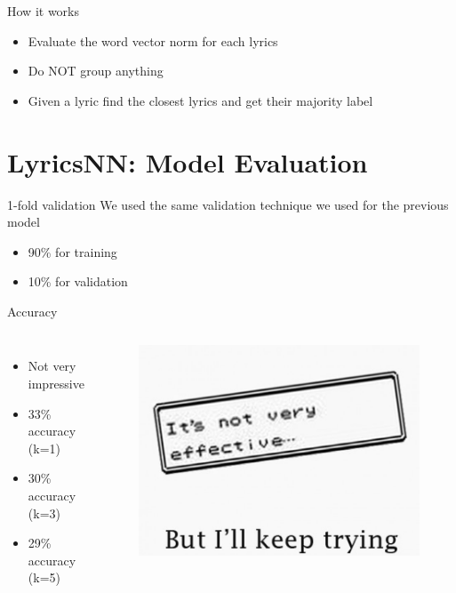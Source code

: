 \documentclass[xcolor=dvipsnames]{beamer}
\begin{document}
\begin{frame}{How it works}
\begin{itemize}
\item Evaluate the word vector norm for each lyrics
\item Do NOT group anything
\item Given a lyric find the closest lyrics and get their majority label
\end{itemize}
\end{frame}

\section{LyricsNN: Model Evaluation}

\begin{frame}{1-fold validation}
We used the same validation technique we used for the previous model
\begin{itemize}
\item 90\% for training
\item 10\% for validation
\end{itemize}
\end{frame}

\begin{frame}{Accuracy}
\begin{columns}
\begin{itemize}
\item Not very impressive
\item 33\% accuracy (k=1)
\item 30\% accuracy (k=3)
\item 29\% accuracy (k=5)
\end{itemize}
\begin{figure}
	\includegraphics[scale=0.25,left]{./images/not-effective.jpg}
\end{figure}
\end{columns}
\end{frame}
\end{document}
